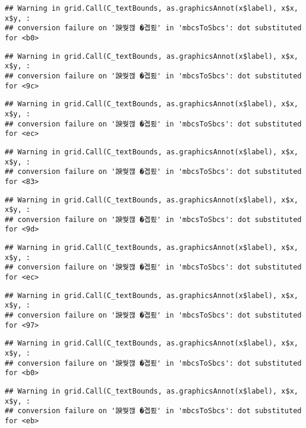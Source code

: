 \documentclass[
]{article}
\begin{document}
\begin{verbatim}
## Warning in grid.Call(C_textBounds, as.graphicsAnnot(x$label), x$x, x$y, :
## conversion failure on '諛쒖깮 �곕룄' in 'mbcsToSbcs': dot substituted for <b0>
\end{verbatim}

\begin{verbatim}
## Warning in grid.Call(C_textBounds, as.graphicsAnnot(x$label), x$x, x$y, :
## conversion failure on '諛쒖깮 �곕룄' in 'mbcsToSbcs': dot substituted for <9c>
\end{verbatim}

\begin{verbatim}
## Warning in grid.Call(C_textBounds, as.graphicsAnnot(x$label), x$x, x$y, :
## conversion failure on '諛쒖깮 �곕룄' in 'mbcsToSbcs': dot substituted for <ec>
\end{verbatim}

\begin{verbatim}
## Warning in grid.Call(C_textBounds, as.graphicsAnnot(x$label), x$x, x$y, :
## conversion failure on '諛쒖깮 �곕룄' in 'mbcsToSbcs': dot substituted for <83>
\end{verbatim}

\begin{verbatim}
## Warning in grid.Call(C_textBounds, as.graphicsAnnot(x$label), x$x, x$y, :
## conversion failure on '諛쒖깮 �곕룄' in 'mbcsToSbcs': dot substituted for <9d>
\end{verbatim}

\begin{verbatim}
## Warning in grid.Call(C_textBounds, as.graphicsAnnot(x$label), x$x, x$y, :
## conversion failure on '諛쒖깮 �곕룄' in 'mbcsToSbcs': dot substituted for <ec>
\end{verbatim}

\begin{verbatim}
## Warning in grid.Call(C_textBounds, as.graphicsAnnot(x$label), x$x, x$y, :
## conversion failure on '諛쒖깮 �곕룄' in 'mbcsToSbcs': dot substituted for <97>
\end{verbatim}

\begin{verbatim}
## Warning in grid.Call(C_textBounds, as.graphicsAnnot(x$label), x$x, x$y, :
## conversion failure on '諛쒖깮 �곕룄' in 'mbcsToSbcs': dot substituted for <b0>
\end{verbatim}

\begin{verbatim}
## Warning in grid.Call(C_textBounds, as.graphicsAnnot(x$label), x$x, x$y, :
## conversion failure on '諛쒖깮 �곕룄' in 'mbcsToSbcs': dot substituted for <eb>
\end{verbatim}
\end{document}
